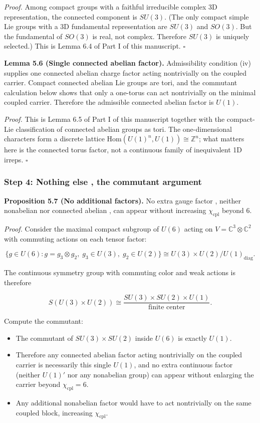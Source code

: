 \emph{Proof.} Among compact groups with a faithful irreducible complex 3D representation, the connected component is \(SU(3)\). (The only compact simple Lie groups with a 3D fundamental representation are \(SU(3)\) and \(SO(3)\). But the fundamental of \(SO(3)\) is real, not complex. Therefore \(SU(3)\) is uniquely selected.) This is Lemma 6.4 of Part I of this manuscript. \(\square\)

\textbf{Lemma 5.6 (Single connected abelian factor).} Admissibility condition (iv) supplies one connected abelian charge factor acting nontrivially on the coupled carrier. Compact connected abelian Lie groups are tori, and the commutant calculation below shows that only a one-torus can act nontrivially on the minimal coupled carrier. Therefore the admissible connected abelian factor is \(U(1)\).

\emph{Proof.} This is Lemma 6.5 of Part I of this manuscript together with the compact-Lie classification of connected abelian groups as tori. The one-dimensional characters form a discrete lattice \(\mathrm{Hom}(U(1)^n,U(1)) \cong \mathbb{Z}^n\); what matters here is the connected torus factor, not a continuous family of inequivalent 1D irreps. \(\square\)

\subsubsection{Step 4: Nothing else , the commutant argument}\label{step-4-nothing-else--the-commutant-argument}

\textbf{Proposition 5.7 (No additional factors).} No extra gauge factor , neither nonabelian nor connected abelian , can appear without increasing \(\chi_{\mathrm{cpl}}\) beyond 6.

\emph{Proof.} Consider the maximal compact subgroup of \(U(6)\) acting on \(V = \mathbb{C}^3 \otimes \mathbb{C}^2\) with commuting actions on each tensor factor:

\[\{g \in U(6) : g = g_3 \otimes g_2,\; g_3 \in U(3),\; g_2 \in U(2)\} \cong U(3) \times U(2) / U(1)_{\mathrm{diag}}.\]

The continuous symmetry group with commuting color and weak actions is therefore

\[S(U(3) \times U(2)) \cong \frac{SU(3) \times SU(2) \times U(1)}{\text{finite center}}.\]

Compute the commutant:

\begin{itemize}
\tightlist
\item
  The commutant of \(SU(3) \times SU(2)\) inside \(U(6)\) is exactly \(U(1)\).
\item
  Therefore any connected abelian factor acting nontrivially on the coupled carrier is necessarily this single \(U(1)\), and no extra continuous factor (neither \(U(1)'\) nor any nonabelian group) can appear without enlarging the carrier beyond \(\chi_{\mathrm{cpl}} = 6\).
\item
  Any additional nonabelian factor would have to act nontrivially on the same coupled block, increasing \(\chi_{\mathrm{cpl}}\).
\end{itemize}


